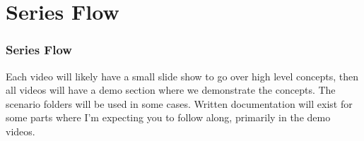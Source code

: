 \documentclass{beamer}
\begin{document}
\section{Series Flow}
\begin{frame}\frametitle{Series Flow}
  Each video will likely have a small slide show to go over high level concepts, then all videos will have a demo section where we demonstrate the concepts.  The scenario folders will be used in some cases.  Written documentation will exist for some parts where I'm expecting you to follow along, primarily in the demo videos.
\end{frame}
\end{document}
